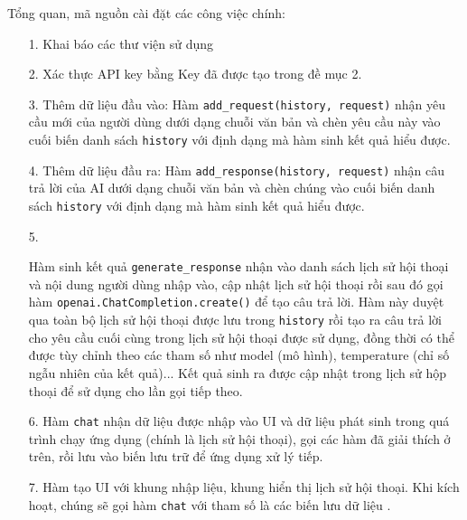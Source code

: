 \documentclass[a4paper, 12pt]{article}
\begin{document}
	Tổng quan, mã nguồn cài đặt các công việc chính:
	\begin{itemize}
		\item[1.] Khai báo các thư viện sử dụng
		\item[2.] Xác thực API key bằng Key đã được tạo trong đề mục 2.
		
		\item[3.] Thêm dữ liệu đầu vào: Hàm \texttt{add\_request(history, request)} nhận yêu cầu mới của người dùng dưới dạng chuỗi văn bản và chèn yêu cầu này vào cuối biến danh sách \texttt{history} với định dạng mà hàm sinh kết quả hiểu được. 
		\item[4.] Thêm dữ liệu đầu ra: Hàm \texttt{add\_response(history, request)} nhận câu trả lời của AI dưới dạng chuỗi văn bản và  chèn chúng vào cuối biến danh sách \texttt{history} với định dạng mà hàm sinh kết quả  hiểu được. 
		\item[5.] \begin{sloppypar}Hàm sinh kết quả \texttt{generate\_response} nhận vào danh sách lịch sử  hội thoại và nội dung người dùng nhập vào, cập nhật lịch sử hội thoại rồi sau đó gọi hàm \texttt{openai.ChatCompletion.create()} để tạo câu trả lời. Hàm này duyệt qua toàn bộ lịch sử hội thoại được lưu trong \texttt{history} rồi tạo ra câu trả lời cho yêu cầu cuối cùng trong lịch sử hội thoại được sử dụng, đồng thời có thể được tùy chỉnh theo các tham số như model (mô hình), temperature (chỉ số ngẫu nhiên của kết quả)... Kết quả sinh ra được cập nhật trong lịch sử hộp thoại để sử dụng cho lần gọi tiếp theo. \end{sloppypar}
		\item[6.] Hàm \texttt{chat} nhận dữ liệu được nhập vào UI và dữ liệu phát sinh trong quá trình chạy ứng dụng (chính là lịch sử hội thoại), gọi các hàm đã giải thích ở trên, rồi lưu vào biến lưu trữ để ứng dụng xử lý tiếp.
		\item[7.] Hàm tạo UI với khung nhập liệu, khung hiển thị lịch sử hội thoại. Khi kích hoạt, chúng sẽ gọi hàm \texttt{chat} với tham số là các biến lưu dữ liệu .
	\end{itemize}
\end{document}
